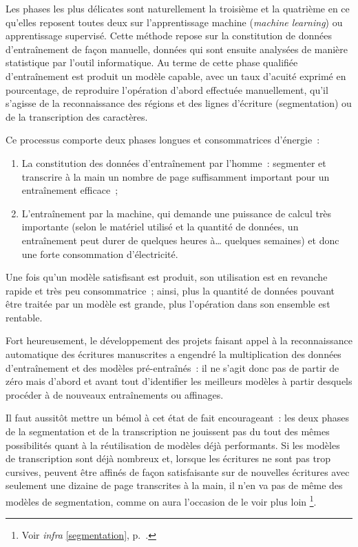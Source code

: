 \documentclass[a4paper,12pt,twoside]{book}
\begin{document}
			Les phases les plus délicates sont naturellement la troisième et la quatrième en ce qu'elles reposent toutes deux sur l'apprentissage machine (\textit{machine learning}) ou apprentissage supervisé. Cette méthode repose sur la constitution de données d'entraînement de façon manuelle, données qui sont ensuite analysées de manière statistique par l'outil informatique. Au terme de cette phase qualifiée d'entraînement est produit un modèle capable, avec un taux d'acuité exprimé en pourcentage, de reproduire l'opération d'abord effectuée manuellement, qu'il s'agisse de la reconnaissance des régions et des lignes d'écriture (segmentation) ou de la transcription des caractères.
			
			Ce processus comporte deux phases longues et consommatrices d'énergie~:
			
			\begin{enumerate}
				\item La constitution des données d'entraînement par l'homme~: segmenter et transcrire à la main un nombre de page suffisamment important pour un entraînement efficace~;
				\item L'entraînement par la machine, qui demande une puissance de calcul très importante (selon le matériel utilisé et la quantité de données, un entraînement peut durer de quelques heures à… quelques semaines) et donc une forte consommation d'électricité.
			\end{enumerate}
			
			Une fois qu'un modèle satisfisant est produit, son utilisation est en revanche rapide et très peu consommatrice~; ainsi, plus la quantité de données pouvant être traitée par un modèle est grande, plus l'opération dans son ensemble est rentable.
			
			Fort heureusement, le développement des projets faisant appel à la reconnaissance automatique des écritures manuscrites a engendré la multiplication des données d'entraînement et des modèles pré-entraînés~: il ne s'agit donc pas de partir de zéro mais d'abord et avant tout d'identifier les meilleurs modèles à partir desquels procéder à de nouveaux entraînements ou affinages.
			
			Il faut aussitôt mettre un bémol à cet état de fait encourageant~: les deux phases de la segmentation et de la transcription ne jouissent pas du tout des mêmes possibilités quant à la réutilisation de modèles déjà performants. Si les modèles de transcription sont déjà nombreux et, lorsque les écritures ne sont pas trop cursives, peuvent être affinés de façon satisfaisante sur de nouvelles écritures avec seulement une dizaine de page transcrites à la main, il n'en va pas de même des modèles de segmentation, comme on aura l'occasion de le voir plus loin
			\footnote{Voir \textit{infra} \ref{segmentation}, p.~\pageref{segmentation}.}.
			
\end{document}
